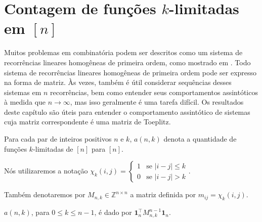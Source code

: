 \section{Contagem de funções \texorpdfstring{$k$}{k}-limitadas em \texorpdfstring{$[n]$}{[n]}} \vspace{1cm} Muitos problemas em combinatória podem ser descritos como um sistema de recorrências lineares homogêneas de primeira ordem, como mostrado em \cite{coulson}. Todo sistema de recorrências lineares homogêneas de primeira ordem pode ser expresso na forma de matriz. Às vezes, também é útil considerar sequências desses sistemas em $n$ recorrências, bem como entender seus comportamentos assintóticos à medida que $n \to \infty$, mas isso geralmente é uma tarefa difícil. Os resultados deste capítulo são úteis para entender o comportamento assintótico de sistemas cuja matriz correspondente é uma matriz de Toeplitz.

Para cada par de inteiros positivos $n$ e $k$, $a(n,k)$ denota a quantidade de funções $k$-limitadas de $[n]$ para $[n]$.

Nós utilizaremos a notação $\chi_k(i, j) = \begin{cases} 1 & \text{se } \lvert i - j\rvert \le k \\ 0 & \text{se } \lvert i - j\rvert > k \end{cases}$.

Também denotaremos por $M_{n,k} \in \mathbb{Z}^{n \times n}$ a matriz definida por $m_{ij} = \chi_k(i, j)$.

\begin{theorem} \label{th:matrix-form-n-to-n} $a(n,k)$, para $0 \le k \le n - 1$, é dado por $\mathbf{1}_n^\intercal M_{n,k}^{n-1} \mathbf{1}_n$. \end{theorem}

